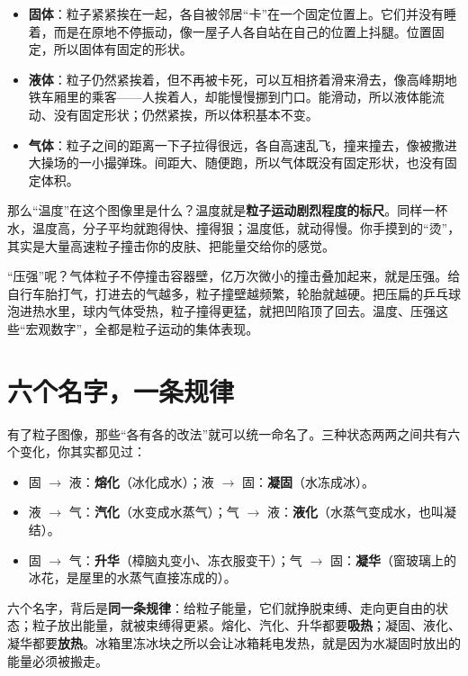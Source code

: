 \begin{itemize}[itemsep=2pt]
\item \textbf{固体}：粒子紧紧挨在一起，各自被邻居“卡”在一个固定位置上。它们并没有睡着，而是在原地不停振动，像一屋子人各自站在自己的位置上抖腿。位置固定，所以固体有固定的形状。
\item \textbf{液体}：粒子仍然紧挨着，但不再被卡死，可以互相挤着滑来滑去，像高峰期地铁车厢里的乘客——人挨着人，却能慢慢挪到门口。能滑动，所以液体能流动、没有固定形状；仍然紧挨，所以体积基本不变。
\item \textbf{气体}：粒子之间的距离一下子拉得很远，各自高速乱飞，撞来撞去，像被撒进大操场的一小撮弹珠。间距大、随便跑，所以气体既没有固定形状，也没有固定体积。
\end{itemize}

那么“温度”在这个图像里是什么？温度就是\textbf{粒子运动剧烈程度的标尺}。同样一杯水，温度高，分子平均就跑得快、撞得狠；温度低，就动得慢。你手摸到的“烫”，其实是大量高速粒子撞击你的皮肤、把能量交给你的感觉。

“压强”呢？气体粒子不停撞击容器壁，亿万次微小的撞击叠加起来，就是压强。给自行车胎打气，打进去的气越多，粒子撞壁越频繁，轮胎就越硬。把压扁的乒乓球泡进热水里，球内气体受热，粒子撞得更猛，就把凹陷顶了回去。温度、压强这些“宏观数字”，全都是粒子运动的集体表现。

\section{六个名字，一条规律}

有了粒子图像，那些“各有各的改法”就可以统一命名了。三种状态两两之间共有六个变化，你其实都见过：

\begin{itemize}[itemsep=2pt]
\item 固 $\rightarrow$ 液：\textbf{熔化}（冰化成水）；液 $\rightarrow$ 固：\textbf{凝固}（水冻成冰）。
\item 液 $\rightarrow$ 气：\textbf{汽化}（水变成水蒸气）；气 $\rightarrow$ 液：\textbf{液化}（水蒸气变成水，也叫凝结）。
\item 固 $\rightarrow$ 气：\textbf{升华}（樟脑丸变小、冻衣服变干）；气 $\rightarrow$ 固：\textbf{凝华}（窗玻璃上的冰花，是屋里的水蒸气直接冻成的）。
\end{itemize}

六个名字，背后是\textbf{同一条规律}：给粒子能量，它们就挣脱束缚、走向更自由的状态；粒子放出能量，就被束缚得更紧。熔化、汽化、升华都要\textbf{吸热}；凝固、液化、凝华都要\textbf{放热}。冰箱里冻冰块之所以会让冰箱耗电发热，就是因为水凝固时放出的能量必须被搬走。

